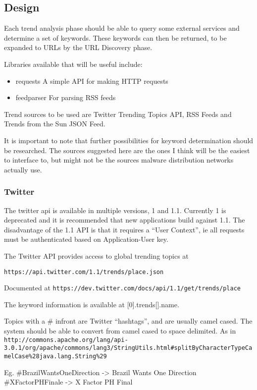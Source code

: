 \subsection{Design}
Each trend analysis phase should be able to query some external services and determine a set of keywords. These keywords can then be returned, to be expanded to URLs by the URL Discovery phase.

Libraries available that will be useful include:

\begin{itemize}
    \item requests A simple API for making HTTP requests
    \item feedparser For parsing RSS feeds
\end{itemize}

Trend sources to be used are Twitter Trending Topics API, RSS Feeds and Trends from the Sun JSON Feed.

It is important to note that further possibilities for keyword determination should be researched. The sources suggested here are the ones I think will be the easiest to interface to, but might not be the sources malware distribution networks actually use.

\subsubsection{Twitter}
The twitter api is available in multiple versions, 1 and 1.1. Currently 1 is deprecated and it is recommended that new applications build against 1.1.  The disadvantage of the 1.1 API is that it requires a ``User Context'', ie all requests must be authenticated based on Application-User key.

The Twitter API provides access to global trending topics at

\verb`https://api.twitter.com/1.1/trends/place.json`

Documented at \verb`https://dev.twitter.com/docs/api/1.1/get/trends/place`

The keyword information is available at [0].trends[].name.

Topics with a \# infront are Twitter ``hashtags'', and are usually camel cased. The system should be able to convert from camel cased to space delimited. As in \verb`http://commons.apache.org/lang/api-3.0.1/org/apache/commons/lang3/StringUtils.html#splitByCharacterTypeCamelCase%28java.lang.String%29`

Eg. \#BrazilWantsOneDirection -> Brazil Wants One Direction
\#XFactorPHFinale -> X Factor PH Final

